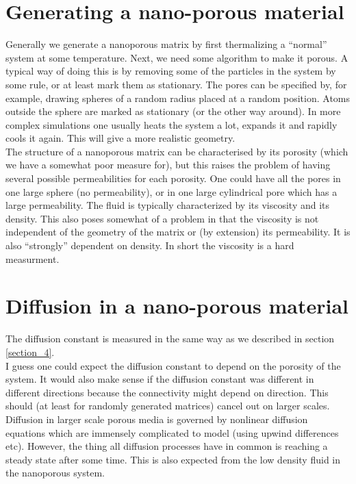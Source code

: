 \documentclass[a4paper,english, 10pt, twoside]{article}
\begin{document}
\section{Generating a nano-porous material}
Generally we generate a nanoporous matrix by first thermalizing a ``normal'' system at some temperature. 
Next, we need some algorithm to make it porous. A typical way of doing this is by removing some of the particles 
in the system by some rule, or at least mark them as stationary. The pores can be specified by, for example, 
drawing spheres of a random radius placed at a random position. Atoms outside the sphere are marked as stationary 
(or the other way around). In more complex simulations one usually heats the system a lot, expands it and rapidly cools 
it again. This will give a more realistic geometry.\\
The structure of a nanoporous matrix can be characterised by its porosity (which we have a somewhat poor measure for), but 
this raises the problem of having several possible permeabilities for each porosity. One could have all the pores in one 
large sphere (no permeability), or in one large cylindrical pore which has a large permeability. The fluid is typically 
characterized by its viscosity and its density. This also poses somewhat of a problem in that the viscosity is not 
independent of the geometry of the matrix or (by extension) its permeability. It is also ``strongly'' dependent on 
density. In short the viscosity is a hard measurment.

\section{Diffusion in a nano-porous material}
The diffusion constant is measured in the same way as we described in section \ref{section_4}. \\
I guess one could expect the diffusion constant to depend on the porosity of the system. 
It would also make sense if the diffusion constant was different in different directions because the connectivity might depend on direction. This 
should (at least for randomly generated matrices) cancel out on larger scales. \\
Diffusion in larger scale porous media is governed by nonlinear diffusion equations which are immensely complicated 
to model (using upwind differences etc). However, the thing all diffusion processes have in common is reaching a steady 
state after some time. This is also expected from the low density fluid in the nanoporous system.
\end{document}

